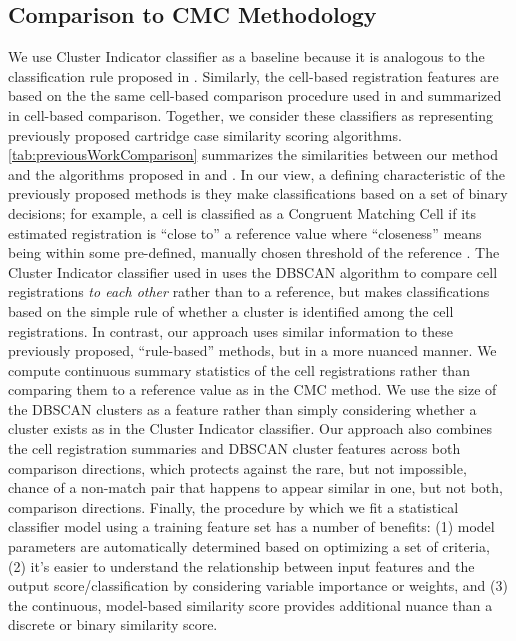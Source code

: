 \documentclass[reprint]{JASA}
\begin{document}
\hypertarget{comparison-to-cmc-methodology}{%
\subsection{Comparison to CMC
Methodology}\label{comparison-to-cmc-methodology}}

We use Cluster Indicator classifier as a baseline because it is
analogous to the classification rule proposed in
\citet{zhang_convergence_2021}. Similarly, the cell-based registration
features are based on the the same cell-based comparison procedure used
in \citet{song_proposed_2013} and summarized in cell-based comparison.
Together, we consider these classifiers as representing previously
proposed cartridge case similarity scoring algorithms.
\autoref{tab:previousWorkComparison} summarizes the similarities between
our method and the algorithms proposed in \citet{zhang_convergence_2021}
and \citet{song_proposed_2013}. In our view, a defining characteristic
of the previously proposed methods is they make classifications based on
a set of binary decisions; for example, a cell is classified as a
Congruent Matching Cell if its estimated registration is ``close to'' a
reference value where ``closeness'' means being within some pre-defined,
manually chosen threshold of the reference \citep{song_proposed_2013}.
The Cluster Indicator classifier used in \citet{zhang_convergence_2021}
uses the DBSCAN algorithm to compare cell registrations \emph{to each
other} rather than to a reference, but makes classifications based on
the simple rule of whether a cluster is identified among the cell
registrations. In contrast, our approach uses similar information to
these previously proposed, ``rule-based'' methods, but in a more nuanced
manner. We compute continuous summary statistics of the cell
registrations rather than comparing them to a reference value as in the
CMC method. We use the size of the DBSCAN clusters as a feature rather
than simply considering whether a cluster exists as in the Cluster
Indicator classifier. Our approach also combines the cell registration
summaries and DBSCAN cluster features across both comparison directions,
which protects against the rare, but not impossible, chance of a
non-match pair that happens to appear similar in one, but not both,
comparison directions. Finally, the procedure by which we fit a
statistical classifier model using a training feature set has a number
of benefits: (1) model parameters are automatically determined based on
optimizing a set of criteria, (2) it's easier to understand the
relationship between input features and the output score/classification
by considering variable importance or weights, and (3) the continuous,
model-based similarity score provides additional nuance than a discrete
or binary similarity score.
\end{document}
